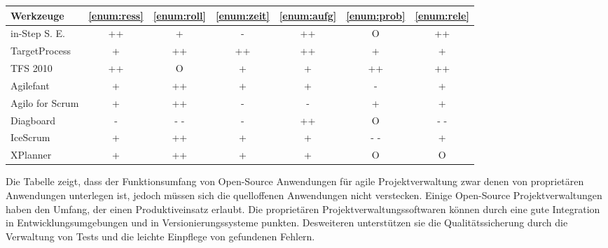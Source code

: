 \begin{center}
\begin{tabular}[h]{l|c|c|c|c|c|c}
\textbf{Werkzeuge} & \textbf{\ref{enum:ress}} & \textbf{\ref{enum:roll}} & \textbf{\ref{enum:zeit}} & \textbf{\ref{enum:aufg}} & \textbf{\ref{enum:prob}} & \textbf{\ref{enum:rele}}\\
\hline
in-Step S. E. & ++ & + & - & ++ & O & ++\\
TargetProcess & + & ++ & ++ & ++ & + & +\\
TFS 2010 & ++ & O & + & + & ++ & ++\\
\hline
Agilefant & + & ++ & + & + & - & +\\
Agilo for Scrum & + & ++ & - & - & + & +\\
Diagboard & - & - - & - & ++ & O & - -\\
IceScrum & + & ++ & + & + & - - & +\\
XPlanner & + & ++ & + & + & O & O\\
\end{tabular}
\end{center}

Die Tabelle zeigt, dass der Funktionsumfang von Open-Source Anwendungen für agile Projektverwaltung zwar denen von proprietären Anwendungen unterlegen ist, jedoch müssen sich die quelloffenen Anwendungen nicht verstecken. Einige Open-Source Projektverwaltungen haben den Umfang, der einen Produktiveinsatz erlaubt. Die proprietären Projektverwaltungssoftwaren können durch eine gute Integration in Entwicklungsumgebungen und in Versionierungssysteme punkten. Desweiteren unterstützen sie die Qualitätssicherung durch die Verwaltung von Tests und die leichte Einpflege von gefundenen Fehlern.
